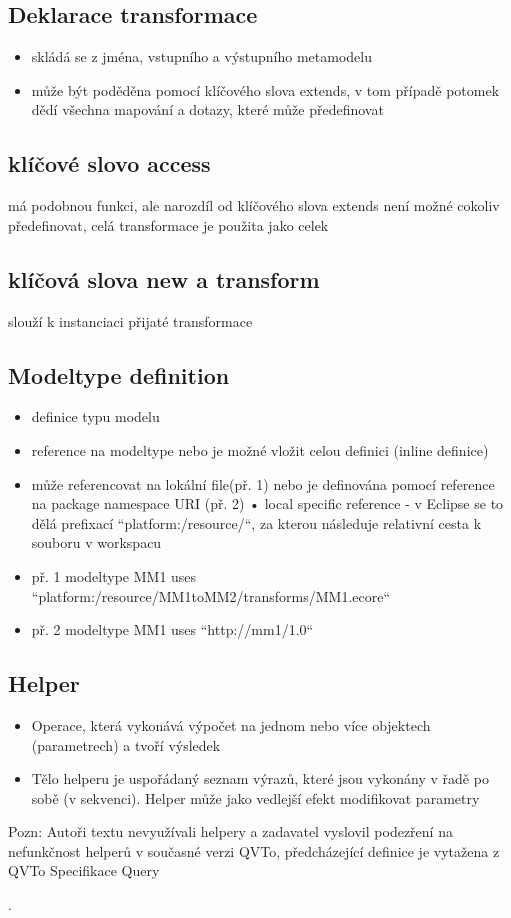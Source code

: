 \documentclass[11pt,a4paper]{article}   	%
\begin{document}
\begin{itemize}
\subsection {Deklarace transformace}
\begin{itemize}
  \item 	skládá se z jména, vstupního a výstupního metamodelu
  \item 	může být poděděna pomocí klíčového slova extends, v tom případě potomek
  dědí všechna mapování a dotazy, které může předefinovat
\end{itemize}

\subsection { klíčové slovo access }
má podobnou funkci, ale narozdíl od klíčového slova extends není možné cokoliv
předefinovat, celá transformace je použita jako celek

\subsection {klíčová slova new a transform}
 slouží k instanciaci přijaté transformace 
 
\subsection {Modeltype definition}
\begin {itemize}
  	\item	definice typu modelu  
  	\item 	reference na modeltype nebo je možné vložit celou definici
			(inline definice)
	\item	může referencovat na lokální file(př. 1) nebo je definována pomocí
			reference na package namespace URI (př. 2) • local specific reference - v
			Eclipse se to dělá prefixací “platform:/resource/“, za kterou následuje
			relativní cesta k souboru v workspacu
	\item 	př. 1 modeltype MM1 uses
			“platform:/resource/MM1toMM2/transforms/MM1.ecore“
	\item	př. 2 modeltype MM1 uses “http://mm1/1.0“
\end{itemize} 


\subsection {Helper}
\begin {itemize}
  	\item	Operace, která vykonává výpočet na jednom nebo více objektech
			(parametrech) a tvoří výsledek
	\item	Tělo helperu je uspořádaný seznam výrazů, které jsou vykonány v řadě po
			sobě (v sekvenci). Helper může jako vedlejší efekt modifikovat parametry
\end{itemize}
Pozn: Autoři textu nevyužívali helpery a zadavatel vyslovil podezření na nefunkčnost helperů v současné verzi QVTo, předcházející definice je vytažena z QVTo Specifikace Query \end{itemize}. 
\end{document}
